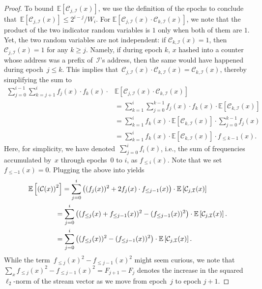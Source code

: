 \documentclass[sigconf]{acmart}
\newcommand{\parentheses}[1]{\left(#1\right)}
\newcommand{\expectation}[1]{\mathbb{E}\left[ #1 \right]}
\begin{document}
\begin{proof}
    To bound~$\expectation{ \mathcal{C}_{j,\mathcal{I}}(x)}$, we use the
    definition of the epochs to conclude that~$\expectation{ 
    \mathcal{C}_{j,\mathcal{I}}(x)}  \leq 2^{i-j}/W_i$. For $\expectation{ 
    \mathcal{C}_{j,\mathcal{I}}(x) \cdot \mathcal{C}_{k,\mathcal{I}}(x) }$,
    we note that the product of the two indicator random variables is $1$ only
    when both of them are $1$. Yet, the two random variables are not
    independent: if $\mathcal{C}_{k,\mathcal{I}}(x) =1$, then $
    \mathcal{C}_{j,\mathcal{I}}(x)=1$ for any $k\geq j$. Namely, if during
    epoch $k$, $x$ hashed into a counter whose address was a prefix
    of~$\mathcal{I}$'s address, then the same would have happened during
    epoch~$j \leq k$. This implies that~$\mathcal{C}_{j,\mathcal{I}}(x) \cdot
    \mathcal{C}_{k,\mathcal{I}}(x) = \mathcal{C}_{k,\mathcal{I}}(x)$, thereby
    simplifying the sum to
    \begin{align*}
        \sum_{j=0}^{i-1}  \sum_{k=j+1}^i   f_j(x)  \cdot f_k(x) \cdot & \expectation{ \mathcal{C}_{j,\mathcal{I}}(x) \cdot \mathcal{C}_{k,\mathcal{I}}(x) }  \\ 
        & = \sum_{k=1}^i \sum_{j=0}^{k-1}  f_j(x)  \cdot f_k(x) \cdot   \expectation{ \mathcal{C}_{k,\mathcal{I}}(x) }\\
        & = \sum_{k=1}^i   f_k(x) \cdot   \expectation{ \mathcal{C}_{k,\mathcal{I}}(x) } \cdot \sum_{j=0}^{k-1}  f_j(x)\\
        & = \sum_{k=1}^i   f_k(x) \cdot   \expectation{ \mathcal{C}_{k,\mathcal{I}}(x) } \cdot f_{\leq k-1}(x).
    \end{align*}
    Here, for simplicity, we have denoted~$\sum_{j=0}^{i} f_i(x)$, i.e., the
    sum of frequencies accumulated by~$x$ through epochs~0 to $i$, as $f_{\leq
    {i}}(x)$. Note that we set~$f_{\leq -1}(x)=0$. Plugging the above into
     yields
    \begin{align*}
        \expectation{\parentheses{\mathcal{C}(x)}^2} &= \sum_{j=0}^i \parentheses{(f_j(x))^2  + 2 f_j(x) \cdot f_{\leq j-1}(x)} \cdot \expectation{ \mathcal{C}_{j,\mathcal{I}}(x)}  \\
        & \mkern-18mu = \sum_{j=0}^i \parentheses{(f_{\leq j}(x) + f_{\leq j-1}(x))^2 - (f_{\leq j-1}(x))^2} \cdot \expectation{ \mathcal{C}_{j,\mathcal{I}}(x)}. \\
        & \mkern-18mu = \sum_{j=0}^i \parentheses{(f_{\leq j}(x))^2  - (f_{\leq j-1}(x))^2} \cdot \expectation{ \mathcal{C}_{j,\mathcal{I}}(x)}.
    \end{align*}
    While the term~${f_{\leq j}(x) }^2  - {f_{\leq j-1}(x) }^2$ might seem
    curious, we note that~$\sum_x{f_{\leq j}(x) }^2  - {f_{\leq j-1}(x) }^2 =
    F_{j+1} - F_j$ denotes the increase in the
    squared~$\ell_2${\nobreakdash-}norm of the stream vector as we move from
    epoch~$j$ to epoch $j+1$. 


\end{proof}
\end{document}

